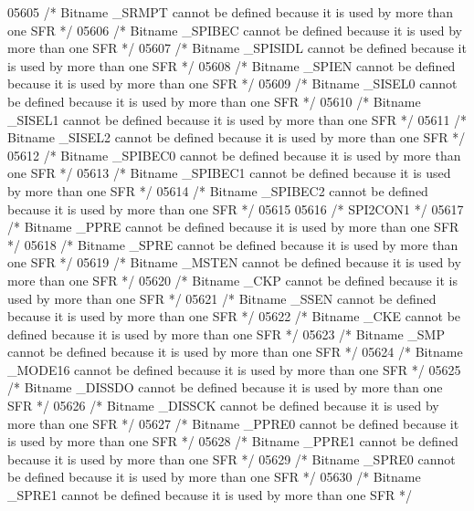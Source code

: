 \begin{DoxyCode}
05605 \textcolor{comment}{/* Bitname \_SRMPT cannot be defined because it is used by more than one SFR */}
05606 \textcolor{comment}{/* Bitname \_SPIBEC cannot be defined because it is used by more than one SFR */}
05607 \textcolor{comment}{/* Bitname \_SPISIDL cannot be defined because it is used by more than one SFR */}
05608 \textcolor{comment}{/* Bitname \_SPIEN cannot be defined because it is used by more than one SFR */}
05609 \textcolor{comment}{/* Bitname \_SISEL0 cannot be defined because it is used by more than one SFR */}
05610 \textcolor{comment}{/* Bitname \_SISEL1 cannot be defined because it is used by more than one SFR */}
05611 \textcolor{comment}{/* Bitname \_SISEL2 cannot be defined because it is used by more than one SFR */}
05612 \textcolor{comment}{/* Bitname \_SPIBEC0 cannot be defined because it is used by more than one SFR */}
05613 \textcolor{comment}{/* Bitname \_SPIBEC1 cannot be defined because it is used by more than one SFR */}
05614 \textcolor{comment}{/* Bitname \_SPIBEC2 cannot be defined because it is used by more than one SFR */}
05615 
05616 \textcolor{comment}{/* SPI2CON1 */}
05617 \textcolor{comment}{/* Bitname \_PPRE cannot be defined because it is used by more than one SFR */}
05618 \textcolor{comment}{/* Bitname \_SPRE cannot be defined because it is used by more than one SFR */}
05619 \textcolor{comment}{/* Bitname \_MSTEN cannot be defined because it is used by more than one SFR */}
05620 \textcolor{comment}{/* Bitname \_CKP cannot be defined because it is used by more than one SFR */}
05621 \textcolor{comment}{/* Bitname \_SSEN cannot be defined because it is used by more than one SFR */}
05622 \textcolor{comment}{/* Bitname \_CKE cannot be defined because it is used by more than one SFR */}
05623 \textcolor{comment}{/* Bitname \_SMP cannot be defined because it is used by more than one SFR */}
05624 \textcolor{comment}{/* Bitname \_MODE16 cannot be defined because it is used by more than one SFR */}
05625 \textcolor{comment}{/* Bitname \_DISSDO cannot be defined because it is used by more than one SFR */}
05626 \textcolor{comment}{/* Bitname \_DISSCK cannot be defined because it is used by more than one SFR */}
05627 \textcolor{comment}{/* Bitname \_PPRE0 cannot be defined because it is used by more than one SFR */}
05628 \textcolor{comment}{/* Bitname \_PPRE1 cannot be defined because it is used by more than one SFR */}
05629 \textcolor{comment}{/* Bitname \_SPRE0 cannot be defined because it is used by more than one SFR */}
05630 \textcolor{comment}{/* Bitname \_SPRE1 cannot be defined because it is used by more than one SFR */}

\end{DoxyCode}
